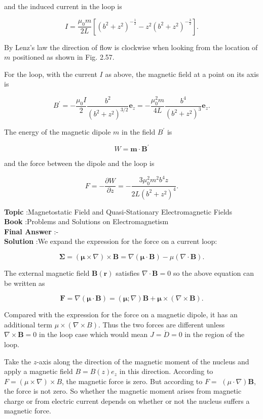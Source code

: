 \documentclass[10pt]{article}
\begin{document}
and the induced current in the loop is

$$
I=\frac{\mu_{0} m}{2 L}\left[\left(b^{2}+z^{2}\right)^{-\frac{1}{2}}-z^{2}\left(b^{2}+z^{2}\right)^{-\frac{3}{2}}\right] .
$$

By Lenz's law the direction of flow is clockwise when looking from the location of $m$ positioned as shown in Fig. 2.57.

 For the loop, with the current $I$ as above, the magnetic field at a point on its axis is

$$
B^{\prime}=-\frac{\mu_{0} I}{2} \frac{b^{2}}{\left(b^{2}+z^{2}\right)^{3 / 2}} \mathbf{e}_{z}=-\frac{\mu_{0}^{2} m}{4 L} \frac{b^{4}}{\left(b^{2}+z^{2}\right)^{3}} \mathbf{e}_{z} .
$$

The energy of the magnetic dipole $m$ in the field $B^{\prime}$ is

$$
W=\mathbf{m} \cdot \mathbf{B}^{\prime}
$$

and the force between the dipole and the loop is

$$
F=-\frac{\partial W}{\partial z}=-\frac{3 \mu_{0}^{2} m^{2} b^{4} z}{2 L\left(b^{2}+z^{2}\right)^{4}} .
$$

\textbf{Topic} :Magnetostatic Field and Quasi-Stationary Electromagnetic Fields\\
\textbf{Book} :Problems and Solutions on Electromagnetism\\
\textbf{Final Answer} :-\\


\textbf{Solution} :We expand the expression for the force on a current loop:

$$
\mathbf{\Sigma}=(\boldsymbol{\mu} \times \nabla) \times \mathbf{B}=\nabla(\boldsymbol{\mu} \cdot \mathbf{B})-\mu(\nabla \cdot \mathbf{B}) .
$$

The external magnetic field $\mathbf{B}(\mathbf{r})$ satisfies $\nabla \cdot \mathbf{B}=0$ so the above equation can be written as

$$
\mathbf{F}=\nabla(\boldsymbol{\mu} \cdot \mathbf{B})=(\boldsymbol{\mu} ; \nabla) \mathbf{B}+\boldsymbol{\mu} \times(\nabla \times \mathbf{B}) .
$$

Compared with the expression for the force on a magnetic dipole, it has an additional term $\mu \times(\nabla \times B)$. Thus the two forces are different unless $\nabla \times \mathbf{B}=0$ in the loop case which would mean $J=\dot{D}=0$ in the region of the loop.

 Take the $z$-axis along the direction of the magnetic moment of the nucleus and apply a magnetic field $B=B(z) e_{z}$ in this direction. According to $F=(\mu \times \nabla) \times B$, the magnetic force is zero. But according to $F=$ $(\mu \cdot \nabla) \mathbf{B}$, the force is not zero. So whether the magnetic moment arises from magnetic charge or from electric current depends on whether or not the nucleus suffers a magnetic force.
\end{document}
